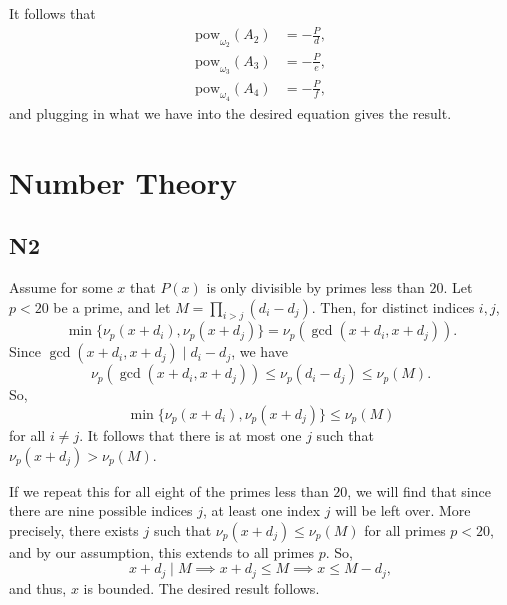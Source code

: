 \documentclass{scrartcl}
\begin{document}
It follows that
\begin{align*}
    \text{pow}_{\omega_2}(A_2) &= -\frac{P}{d}, \\
    \text{pow}_{\omega_3}(A_3) &= -\frac{P}{e}, \\
    \text{pow}_{\omega_4}(A_4) &= -\frac{P}{f},
\end{align*}
and plugging in what we have into the desired equation gives the result.

\section*{Number Theory}
\subsection*{N2}
Assume for some $x$ that $P(x)$ is only divisible by primes less than $20$.
Let $p < 20$ be a prime, and let $M = \prod_{i > j} (d_i - d_j)$.
Then, for distinct indices $i,j$,
\[ \min\{ \nu_p(x + d_i), \nu_p(x + d_j) \} = \nu_p(\gcd(x + d_i, x + d_j)). \]
Since $\gcd(x + d_i, x + d_j) \mid d_i - d_j$, we have
\[ \nu_p(\gcd(x + d_i, x + d_j)) \leq \nu_p(d_i - d_j) \leq \nu_p(M). \]
So,
\[ \min\{ \nu_p(x + d_i), \nu_p(x + d_j) \} \leq \nu_p(M) \]
for all $i \neq j$.
It follows that there is at most one $j$ such that $\nu_p(x + d_j) > \nu_p(M)$.

If we repeat this for all eight of the primes less than $20$, we will find that since there are nine possible indices $j$, at least one index $j$ will be left over.
More precisely, there exists $j$ such that $\nu_p(x + d_j) \leq \nu_p(M)$ for all primes $p < 20$, and by our assumption, this extends to all primes $p$.
So,
\[ x + d_j \mid M \implies x + d_j \leq M \implies x \leq M - d_j, \]
and thus, $x$ is bounded.
The desired result follows.
\end{document}
